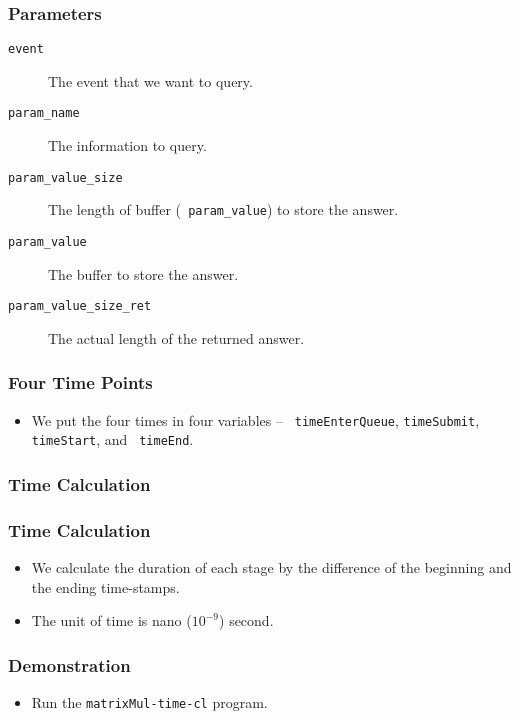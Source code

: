 \documentclass{beamer}
\begin{document}
\begin{frame}
  \frametitle{Parameters}
  \begin{description}
  \item [\tt event] The event that we want to query.
  \item [\tt param\_name] The information to query.
  \item [\tt param\_value\_size] The length of buffer ({\tt
    param\_value}) to store the answer.
  \item [\tt param\_value] The buffer to store the answer.
  \item [\tt param\_value\_size\_ret] The actual length of the
    returned answer.
  \end{description}
\end{frame}

\begin{frame}
  \frametitle{Four Time Points}
  \begin{itemize}
  \item We put the four times in four variables -- {\tt
    timeEnterQueue}, {\tt timeSubmit}, {\tt timeStart}, and {\tt
    timeEnd}.
  \end{itemize}
\end{frame}

\begin{frame}
  \frametitle{Time Calculation}
\end{frame}

\begin{frame}
  \frametitle{Time Calculation}
  \begin{itemize}
  \item We calculate the duration of each stage by the difference of
    the beginning and the ending time-stamps.
  \item The unit of time is nano ($10^{-9}$) second. 
  \end{itemize}
\end{frame}

\begin{frame}
\end{frame}

\begin{frame}
  \frametitle{Demonstration}
  \begin{itemize}
    \item Run the {\tt matrixMul-time-cl} program.
  \end{itemize}
\end{frame}
\end{document}
